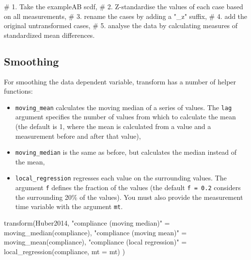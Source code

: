 \documentclass[
  letterpaper,
  DIV=11,
  numbers=noendperiod]{scrreprt}
\newenvironment{Shaded}{\begin{snugshade}}{\end{snugshade}}
\newcommand{\AttributeTok}[1]{\textcolor[rgb]{0.40,0.45,0.13}{#1}}
\newcommand{\CommentTok}[1]{\textcolor[rgb]{0.37,0.37,0.37}{#1}}
\newcommand{\FunctionTok}[1]{\textcolor[rgb]{0.28,0.35,0.67}{#1}}
\newcommand{\NormalTok}[1]{\textcolor[rgb]{0.00,0.23,0.31}{#1}}
\newcommand{\OtherTok}[1]{\textcolor[rgb]{0.00,0.23,0.31}{#1}}
\newcommand{\StringTok}[1]{\textcolor[rgb]{0.13,0.47,0.30}{#1}}
\providecommand{\tightlist}{%
  \setlength{\itemsep}{0pt}\setlength{\parskip}{0pt}}\usepackage{longtable,booktabs,array}
\begin{document}
\begin{Shaded}
\begin{Highlighting}[]
\CommentTok{\# 1. Take the exampleAB scdf,}
\CommentTok{\# 2. Z{-}standardise the values of each case based on all measurements,}
\CommentTok{\# 3. rename the cases by adding a "\_z" suffix,}
\CommentTok{\# 4. add the original untransformed cases,}
\CommentTok{\# 5. analyse the data by calculating measures of standardized mean differences.}
\end{Highlighting}
\end{Shaded}

\hypertarget{smoothing}{%
\subsection{Smoothing}\label{smoothing}}

For smoothing the data dependent variable, transform has a number of
helper functions:

\begin{itemize}
\tightlist
\item
  \texttt{moving\_mean} calculates the moving median of a series of
  values. The \texttt{lag} argument specifies the number of values from
  which to calculate the mean (the default is 1, where the mean is
  calculated from a value and a measurement before and after that
  value),
\item
  \texttt{moving\_median} is the same as before, but calculates the
  median instead of the mean,
\item
  \texttt{local\_regression} regresses each value on the surrounding
  values. The argument \texttt{f} defines the fraction of the values
  (the default \texttt{f\ =\ 0.2} considers the surrounding 20\% of the
  values). You must also provide the measurement time variable with the
  argument \texttt{mt}.
\end{itemize}

\begin{Shaded}
\begin{Highlighting}[]
\FunctionTok{transform}\NormalTok{(Huber2014,}
  \StringTok{"compliance (moving median)"} \OtherTok{=} \FunctionTok{moving\_median}\NormalTok{(compliance),}
  \StringTok{"compliance (moving mean)"} \OtherTok{=} \FunctionTok{moving\_mean}\NormalTok{(compliance),}
  \StringTok{"compliance (local regression)"} \OtherTok{=} \FunctionTok{local\_regression}\NormalTok{(compliance, }\AttributeTok{mt =}\NormalTok{ mt)}
\NormalTok{)}
\end{Highlighting}
\end{Shaded}
\end{document}
